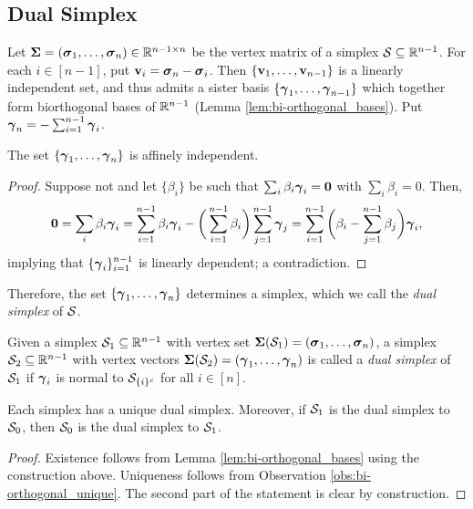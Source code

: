 \subsection{Dual Simplex}
\label{sec:dual_simplex}
Let $\boldsymbol{\Sigma}=(\vb*{\sigma}_1,\dots,\vb*{\sigma}_n)\in\mathbb{R}^{n-1\times n}$ be the vertex matrix of a simplex $\mathcal{S}\subseteq\mathbb{R}^{n-1}$. For each $i\in[n-1]$, put $\vb{v}_i=\vb*{\sigma}_n-\vb*{\sigma}_i$. Then $\{\vb{v}_1,\dots,\vb{v}_{n-1}\}$ is a linearly independent set, and thus admits a sister basis $\{\vb*{\gamma}_1,\dots,\vb*{\gamma}_{n-1}\}$ which together form biorthogonal bases of $\mathbb{R}^{n-1}$ (Lemma \ref{lem:bi-orthogonal_bases}). Put $\vb*{\gamma}_n = -\sum_{i=1}^{n-1}\vb*{\gamma}_i$. 

\begin{claim}
The set 
$\{\vb*{\gamma}_1,\dots,\vb*{\gamma}_n\}$ is affinely independent. 
\end{claim}
\begin{proof}
Suppose not and let $\{\beta_i\}$ be such that $\sum_i \beta_i \vb*{\gamma}_i =\vb{0}$ with $\sum_i\beta_i=0$. Then, 
\[\vb{0} = \sum_i\beta_i\vb*{\gamma}_i = \sum_{i=1}^{n-1} \beta_i \vb*{\gamma}_i - \bigg(\sum_{i=1}^{n-1} \beta_i\bigg)\sum_{j=1}^{n-1}\vb*{\gamma}_j = \sum_{i=1}^{n-1}\bigg(\beta_i-\sum_{j=1}^{n-1}\beta_j\bigg)\vb*{\gamma}_i,\]
implying that $\{\vb*{\gamma}_i\}_{i=1}^{n-1}$ is linearly dependent; a contradiction.  
\end{proof}

Therefore, the set $\{\vb*{\gamma}_1,\dots,\vb*{\gamma}_n\}$ determines a simplex, which we call the \emph{dual simplex} of $\mathcal{S}$. 

\begin{definition}
\label{def:dual_simplex}
Given a simplex $\mathcal{S}_1\subseteq\mathbb{R}^{n-1}$ with vertex set $\boldsymbol{\Sigma}(\mathcal{S}_1)=(\vb*{\sigma}_1,\dots,\vb*{\sigma}_n)$, a simplex $\mathcal{S}_2\subseteq \mathbb{R}^{n-1}$ with vertex vectors $\boldsymbol{\Sigma}(\mathcal{S}_2)=(\vb*{\gamma}_1,\dots,\vb*{\gamma}_n)$ is called a \emph{dual simplex} of $\mathcal{S}_1$ if $\vb*{\gamma}_i$ is normal to $\mathcal{S}_{\{i\}^c}$ for all $i\in[n]$. 
\end{definition}

\begin{lemma}
Each simplex has a unique dual simplex. Moreover, if $\mathcal{S}_1$ is the dual simplex to $\mathcal{S}_0$, then $\mathcal{S}_0$ is the dual simplex to $\mathcal{S}_1$. 
\end{lemma}
\begin{proof}
Existence follows from Lemma \ref{lem:bi-orthogonal_bases} using the construction above. Uniqueness follows from Observation \ref{obs:bi-orthogonal_unique}. The second part of the statement is clear by construction. 
\end{proof}


